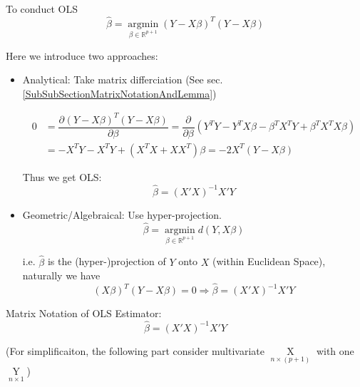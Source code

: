     To conduct OLS
    \begin{equation}
        \hat{\beta }=\mathop{ \arg\min }\limits_{\beta \in \mathbb{R}^{p+1} } (Y-X\beta )^T(Y-X\beta )
    \end{equation}
    
    Here we introduce two approaches:
\begin{itemize}[topsep=2pt,itemsep=2pt]
    \item Analytical: Take matrix differciation (See \hypertarget{MatrixDifferenciation}{sec.\ref{SubSubSectionMatrixNotationAndLemma}})
    

\begin{align*}
    0&=\dfrac{\partial^{} (Y-X\beta )^T(Y-X\beta ) }{\partial \beta ^{}} =\dfrac{\partial^{} }{\partial\beta  ^{}}(Y^TY- Y^TX\beta -\beta ^TX^TY+\beta ^TX^TX\beta )\\ 
    &=-X^TY-X^TY+(X^TX+XX^T)\beta 
    =-2X^T(Y-X\beta )
\end{align*}
    
    Thus we get OLS:
    \begin{equation}
        \hat{\beta }=(X'X)^{-1}X'Y 
    \end{equation}
    
    
    \item Geometric/Algebraical: Use hyper-projection.
    \begin{equation}
        \hat{\beta }=\mathop{ \arg\min }\limits_{\beta \in \mathbb{R}^{p+1} } d(Y,X\beta )
    \end{equation}

    i.e. $ \hat{\beta } $ is the (hyper-)projection of $ Y $ onto $ X $ (within Euclidean Space), naturally we have
    \begin{equation}
        (X\beta )^T(Y-X\beta )=0\Rightarrow \hat{\beta }=(X'X)^{-1}X'Y 
    \end{equation}

\end{itemize}

\begin{point}
    Matrix Notation of OLS Estimator:
    \begin{equation}
        \hat{\beta }=(X'X)^{-1}X'Y 
    \end{equation}
\end{point}

    (For simplificaiton, the following part consider multivariate $ \mathop{X}\limits_{n\times (p+1)}  $ with one $ \mathop{Y}\limits_{n\times 1}  $)

